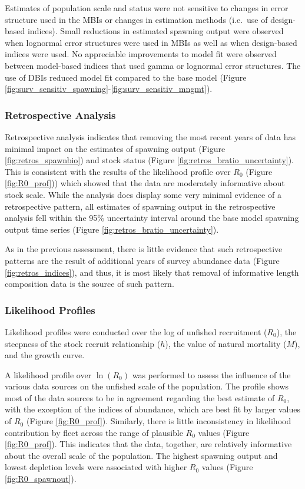 \documentclass[11pt,
  english,
  letterpaper,
]{article}
\begin{document}
Estimates of population scale and status were not sensitive to changes in error structure used in the MBIs or changes in estimation methods (i.e.~use of design-based indices). Small reductions in estimated spawning output were observed when lognormal error structures were used in MBIs as well as when design-based indices were used. No appreciable improvements to model fit were observed between model-based indices that used gamma or lognormal error structures. The use of DBIs reduced model fit compared to the base model (Figure \ref{fig:surv_sensitiv_spawning}-\ref{fig:surv_sensitiv_mngmt}).

\hypertarget{retrospective-analysis}{%
\subsubsection{Retrospective Analysis}\label{retrospective-analysis}}

Retrospective analysis indicates that removing the most recent years of data has minimal impact on the estimates of spawning output (Figure \ref{fig:retros_spawnbio}) and stock status (Figure \ref{fig:retros_bratio_uncertainty}). This is consistent with the results of the likelihood profile over \(R_0\) (Figure \ref{fig:R0_prof})) which showed that the data are moderately informative about stock scale. While the analysis does display some very minimal evidence of a retrospective pattern, all estimates of spawning output in the retrospective analysis fell within the 95\% uncertainty interval around the base model spawning output time series (Figure \ref{fig:retros_bratio_uncertainty}).

As in the previous assessment, there is little evidence that such retrospective patterns are the result of additional years of survey abundance data (Figure \ref{fig:retros_indices}), and thus, it is most likely that removal of informative length composition data is the source of such pattern.

\hypertarget{likelihood-profiles}{%
\subsubsection{Likelihood Profiles}\label{likelihood-profiles}}

Likelihood profiles were conducted over the log of unfished recruitment (\(R_0\)), the steepness of the stock recruit relationship (\(h\)), the value of natural mortality (\(M\)), and the growth curve.

A likelihood profile over \(\ln(R_0)\) was performed to assess the influence of the various data sources on the unfished scale of the population. The profile shows most of the data sources to be in agreement regarding the best estimate of \(R_0\), with the exception of the indices of abundance, which are best fit by larger values of \(R_0\) (Figure \ref{fig:R0_prof}). Similarly, there is little inconsistency in likelihood contribution by fleet across the range of plausible \(R_0\) values (Figure \ref{fig:R0_prof}). This indicates that the data, together, are relatively informative about the overall scale of the population. The highest spawning output and lowest depletion levels were associated with higher \(R_0\) values (Figure \ref{fig:R0_spawnout}).
\end{document}

